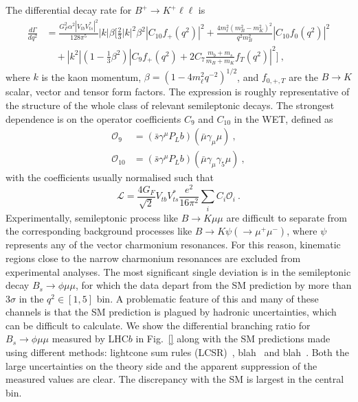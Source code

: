 The differential decay rate for $B^{+} \to K^{+} \ell\ell$ is~\cite{}
\begin{equation}
  \label{eq:dGdq2-bkmumu}
  \begin{aligned}
    \frac{d\Gamma}{dq^{2}} &= \frac{G_{F}^{2} \alpha^{2} |V_{tb}V_{ts}^{*}|^{2}}{128\pi^{5}} |k| \beta \Bigg[ \frac{2}{3}|k|^{2}\beta^{2}|C_{10} f_{+}(q^{2})|^{2} + \frac{4m_{\ell}^{2}(m_{B}^{2} - m_{K}^{2})^{2}}{q^{2}m_{B}^{2}}|C_{10}f_{0}(q^{2})|^{2}\\
    &\quad + |k^{2}| \left(1 - \frac{1}{3}\beta^{2}\right) \left|C_{9}f_{+}(q^{2}) + 2C_{7}\frac{m_{b} + m_{s}}{m_{B} + m_{K}} f_{T}(q^{2})\right|^{2} \Bigg] \ ,
  \end{aligned}
\end{equation}
where $k$ is the kaon momentum, $\beta = (1 - 4 m_{\ell}^{2} q^{-2})^{1/2}$, and
$f_{0, +, T}$ are the $B\to K$ scalar, vector and tensor form factors. The
expression is roughly representative of the structure of the whole class of
relevant semileptonic decays. The strongest dependence is on the operator
coefficients $C_{9}$ and $C_{10}$ in the WET, defined as
\begin{align}
  \mathcal{O}_{9} &= (\bar{s}\gamma^\mu P_L b) (\bar{\mu} \gamma_\mu \mu) \ , \\
  \mathcal{O}_{10} &= (\bar{s}\gamma^\mu P_L b) (\bar{\mu} \gamma_\mu \gamma_5 \mu) \ ,
\end{align}
with the coefficients usually normalised such that
\begin{equation}
  \mathscr{L} = \frac{4 G_{F}}{\sqrt{2}}V_{tb}V_{ts}^{*}\frac{e^{2}}{16\pi^{2}} \sum_{i} C_{i} \mathcal{O}_{i} \ .
\end{equation}
Experimentally, semileptonic process like $B \to K \mu\mu$ are difficult to
separate from the corresponding background processes like
$B \to K \psi (\to \mu^{+}\mu^{-})$, where $\psi$ represents any of the vector
charmonium resonances. For this reason, kinematic regions close to the narrow
charmonium resonances are excluded from experimental analyses. The most
significant single deviation is in the semileptonic decay
$B_{s} \to \phi \mu\mu$, for which the data depart from the SM prediction by
more than $3\sigma$ in the $q^{2} \in [1, 5]$ bin. A problematic feature of this
and many of these channels is that the SM prediction is plagued by hadronic
uncertainties, which can be difficult to calculate. We show the differential
branching ratio for $B_{s} \to \phi \mu\mu$ measured by LHC$b$ in Fig.~\ref{}
along with the SM predictions made using different methods: lightcone sum rules
(LCSR)~\cite{}, blah~\cite{} and blah~\cite{}. Both the large uncertainties on
the theory side and the apparent suppression of the measured values are clear.
The discrepancy with the SM is largest in the central bin.


